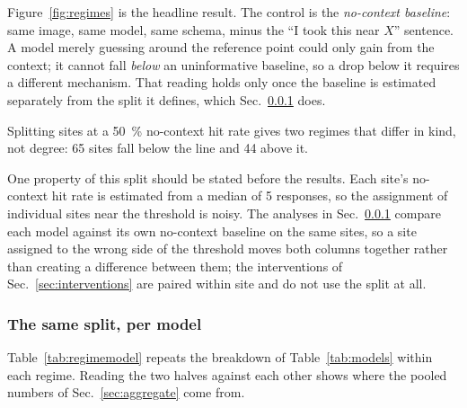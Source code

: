 \documentclass[10pt,a4paper]{article}
\begin{document}
Figure~\ref{fig:regimes} is the headline result.
The control is the \emph{no-context baseline}: same image, same model, same
schema, minus the ``I took this near $X$'' sentence. A model merely guessing
around the reference point could only gain from the context; it cannot fall
\emph{below} an uninformative baseline, so a drop below it requires a different
mechanism. That reading holds only once the baseline is estimated separately
from the split it defines, which Sec.~\ref{sec:regime-model} does.

Splitting sites at a \SI{50}{\percent} no-context hit rate gives two regimes
that differ in kind, not degree: \num{65} sites fall below the line and
\num{44} above it.

One property of this split should be stated before the results. Each site's
no-context hit rate is estimated from a median of \num{5} responses, so the
assignment of individual sites near the threshold is noisy. The analyses in
Sec.~\ref{sec:regime-model} compare each model against its own no-context
baseline on the same sites, so a site assigned to the wrong side of the
threshold moves both columns together rather than creating a difference between
them; the interventions of Sec.~\ref{sec:interventions} are paired within site
and do not use the split at all.

\subsubsection{The same split, per model}
\label{sec:regime-model}
Table~\ref{tab:regimemodel} repeats the breakdown of Table~\ref{tab:models}
within each regime. Reading the two halves against each other shows where the
pooled numbers of Sec.~\ref{sec:aggregate} come from.
\end{document}
